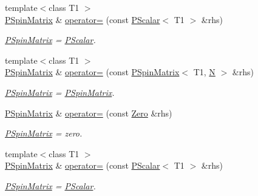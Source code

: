 \begin{DoxyCompactItemize}
{\footnotesize template$<$class T1 $>$ }\\\mbox{\hyperlink{classENSEM_1_1PSpinMatrix}{P\+Spin\+Matrix}} \& \mbox{\hyperlink{classENSEM_1_1PSpinMatrix_a0b0ca395b4662cc2f1a18724aa8354e4}{operator=}} (const \mbox{\hyperlink{classENSEM_1_1PScalar}{P\+Scalar}}$<$ T1 $>$ \&rhs)
\begin{DoxyCompactList}\small\item\em \mbox{\hyperlink{classENSEM_1_1PSpinMatrix}{P\+Spin\+Matrix}} = \mbox{\hyperlink{classENSEM_1_1PScalar}{P\+Scalar}}. \end{DoxyCompactList}\item 
{\footnotesize template$<$class T1 $>$ }\\\mbox{\hyperlink{classENSEM_1_1PSpinMatrix}{P\+Spin\+Matrix}} \& \mbox{\hyperlink{classENSEM_1_1PSpinMatrix_a0346425dd32cab35d2f76c9d5cca8533}{operator=}} (const \mbox{\hyperlink{classENSEM_1_1PSpinMatrix}{P\+Spin\+Matrix}}$<$ T1, \mbox{\hyperlink{adat__devel_2lib_2hadron_2operator__name__util_8cc_a7722c8ecbb62d99aee7ce68b1752f337}{N}} $>$ \&rhs)
\begin{DoxyCompactList}\small\item\em \mbox{\hyperlink{classENSEM_1_1PSpinMatrix}{P\+Spin\+Matrix}} = \mbox{\hyperlink{classENSEM_1_1PSpinMatrix}{P\+Spin\+Matrix}}. \end{DoxyCompactList}\item 
\mbox{\hyperlink{classENSEM_1_1PSpinMatrix}{P\+Spin\+Matrix}} \& \mbox{\hyperlink{classENSEM_1_1PSpinMatrix_a2a776d9189f8d6fa8f9d9bc6758713c9}{operator=}} (const \mbox{\hyperlink{structENSEM_1_1Zero}{Zero}} \&rhs)
\begin{DoxyCompactList}\small\item\em \mbox{\hyperlink{classENSEM_1_1PSpinMatrix}{P\+Spin\+Matrix}} = zero. \end{DoxyCompactList}\item 
{\footnotesize template$<$class T1 $>$ }\\\mbox{\hyperlink{classENSEM_1_1PSpinMatrix}{P\+Spin\+Matrix}} \& \mbox{\hyperlink{classENSEM_1_1PSpinMatrix_a0b0ca395b4662cc2f1a18724aa8354e4}{operator=}} (const \mbox{\hyperlink{classENSEM_1_1PScalar}{P\+Scalar}}$<$ T1 $>$ \&rhs)
\begin{DoxyCompactList}\small\item\em \mbox{\hyperlink{classENSEM_1_1PSpinMatrix}{P\+Spin\+Matrix}} = \mbox{\hyperlink{classENSEM_1_1PScalar}{P\+Scalar}}. \end{DoxyCompactList}\item 

\end{DoxyCompactItemize}
